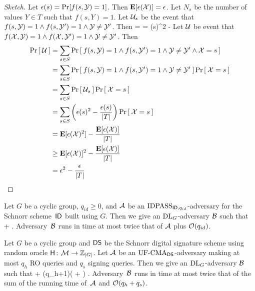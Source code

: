 \begin{proof}[Sketch]
Let $\epsilon(s) = \Pr[f(s,{\cal Y}) = 1]$. 
Then ${\textbf E}[\epsilon({\cal X})] = \epsilon$. Let $N_s$ be the number of values
$Y \in T$ such that $f(s,Y) = 1$. Let ${\cal U}_s$ be the event that $f(s,{\cal Y}) =
1 \land f(s,{\cal Y}') = 1 \land {\cal Y} \ne {\cal Y}'$. Then
\bnm
   =  = \epsilon(s)^2 -  
\enm
Let ${\cal U}$ be event that $f({\cal X},{\cal Y}) = 1 \land f({\cal X},{\cal Y}') = 1 \land
{\cal Y} \ne {\cal Y}'$. Then 
\begin{align*}
  \Pr\left[\: {\cal U} \:\right] 
  & = \sum_{s \in S} \Pr\left[\: f(s,{\cal Y}) = 1 \land f(s,{\cal Y}') = 1 \land {\cal Y} \ne {\cal Y}' \land {\cal X} = s \:\right]\\
  & = \sum_{s \in S} \Pr\left[\: f(s,{\cal Y}) = 1 \land f(s,{\cal Y}') = 1 \land {\cal Y} \ne {\cal Y}' \:\right]\Pr\left[\: {\cal X} = s \:\right]\\
  & = \sum_{s \in S} \Pr\left[\: {\cal U}_s \:\right] \Pr\left[\: {\cal X} = s \:\right]\\
  & = \sum_{s \in S} \left(\epsilon(s)^2 - \frac{\epsilon(s)}{|T|}\right) \Pr\left[\: {\cal X} = s \:\right]\\
  & = {\textbf E}[\epsilon({\cal X})^2] - \frac{{\textbf E}[\epsilon({\cal X})]}{|T|}\\
  & \ge {\textbf E}[\epsilon({\cal X})]^2 - \frac{{\textbf E}[\epsilon({\cal X})]}{|T|}\\
  & = \epsilon^2 - \frac{\epsilon}{|T|}
\end{align*}
\end{proof}



\begin{theorem*}
Let $G$ be a cyclic group, $q_{id} \ge 0$, 
and ${\mathcal A}$ be an $\textnormal{IDPASS}_{\textsf{ID},q_{id}}$-adversary for the Schnorr
scheme~$\textsf{ID}$
built using $G$. Then we give an $\textnormal{DL}_G$-adversary ${\mathcal B}$ such that
\bnm
   \le {} +  \;.
\enm
Adversary~${\mathcal B}$ runs in time at most twice that of ${\mathcal A}$ plus
${\cal O}(q_{id})$.
\end{theorem*}


\begin{theorem*}
Let $G$ be a cyclic group and ${\mathsf{DS}}$ be the Schnorr digital signature scheme
using random oracle $\mathsf{H} {{\kern .05em}\colon{\kern .05em}}{\cal M}\rightarrow{{\mathbb Z}}_{|G|}$.  
Let ${\mathcal A}$ be an $\textnormal{UF-CMA}_{{\mathsf{DS}}}$-adversary making at most $q_h$ RO queries and
$q_s$ signing queries.
Then we give an $\textnormal{DL}_G$-adversary ${\mathcal B}$ such that
\bnm
  \AdvUFCMA{\DS}{\advA} \le {} + (q_h+1)\left( + \right) \;.
\enm
Adversary~${\mathcal B}$ runs in time at most twice that of the sum of the running time
of~${\mathcal A}$ and ${\cal O}(q_h+q_s)$.
\end{theorem*}
